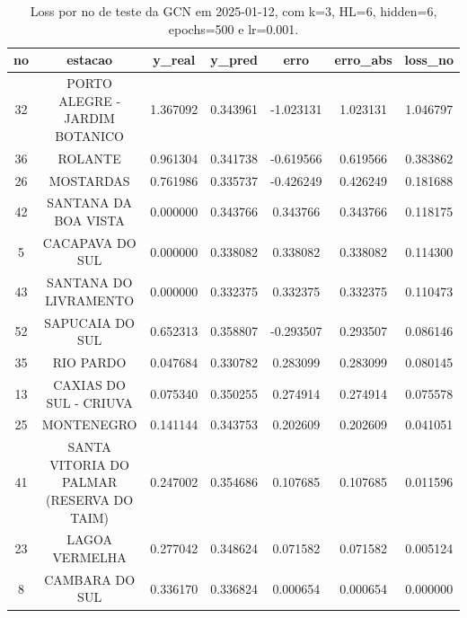 \begin{table}[h]
\centering
\caption{Loss por no de teste da GCN em 2025-01-12, com k=3, HL=6, hidden=6, epochs=500 e lr=0.001.}
\label{tab:gcn_loss_k3_hl6_h6_e500_d20250112}
\begin{tabular}{ccccccc}
\toprule
no & estacao & y\_real & y\_pred & erro & erro\_abs & loss\_no \\
\midrule
32 & PORTO ALEGRE - JARDIM BOTANICO & 1.367092 & 0.343961 & -1.023131 & 1.023131 & 1.046797 \\
36 & ROLANTE & 0.961304 & 0.341738 & -0.619566 & 0.619566 & 0.383862 \\
26 & MOSTARDAS & 0.761986 & 0.335737 & -0.426249 & 0.426249 & 0.181688 \\
42 & SANTANA DA BOA VISTA & 0.000000 & 0.343766 & 0.343766 & 0.343766 & 0.118175 \\
5 & CACAPAVA DO SUL & 0.000000 & 0.338082 & 0.338082 & 0.338082 & 0.114300 \\
43 & SANTANA DO LIVRAMENTO & 0.000000 & 0.332375 & 0.332375 & 0.332375 & 0.110473 \\
52 & SAPUCAIA DO SUL & 0.652313 & 0.358807 & -0.293507 & 0.293507 & 0.086146 \\
35 & RIO PARDO & 0.047684 & 0.330782 & 0.283099 & 0.283099 & 0.080145 \\
13 & CAXIAS DO SUL - CRIUVA & 0.075340 & 0.350255 & 0.274914 & 0.274914 & 0.075578 \\
25 & MONTENEGRO & 0.141144 & 0.343753 & 0.202609 & 0.202609 & 0.041051 \\
41 & SANTA VITORIA DO PALMAR (RESERVA DO TAIM) & 0.247002 & 0.354686 & 0.107685 & 0.107685 & 0.011596 \\
23 & LAGOA VERMELHA & 0.277042 & 0.348624 & 0.071582 & 0.071582 & 0.005124 \\
8 & CAMBARA DO SUL & 0.336170 & 0.336824 & 0.000654 & 0.000654 & 0.000000 \\
\bottomrule
\end{tabular}
\end{table}
